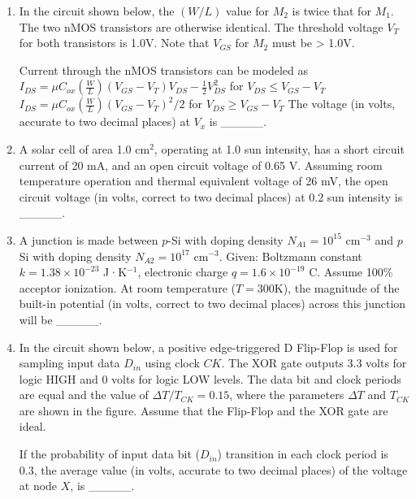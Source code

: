 \documentclass{article}
\begin{document}
\begin{enumerate}
\item In the circuit shown below, the $(W/L)$ value for $M_2$ is twice that for $M_1$. The two nMOS transistors are otherwise identical. The threshold voltage $V_T$ for both transistors is 1.0V. Note that $V_{GS}$ for $M_2$ must be > 1.0V.
\begin{figure}[H]
    \centering
    
    \caption{}
    \label{fig:q53}
\end{figure}
Current through the nMOS transistors can be modeled as
$I_{DS} = \mu C_{ox} \left( \frac{W}{L} \right) \left( V_{GS} - V_T \right) V_{DS} - \frac{1}{2} V_{DS}^2$ for $V_{DS} \leq V_{GS} - V_T$
$I_{DS} = \mu C_{ox} \left( \frac{W}{L} \right) \left( V_{GS} - V_T \right)^2 / 2$ for $V_{DS} \geq V_{GS} - V_T$
The voltage (in volts, accurate to two decimal places) at $V_x$ is \_\_\_\_\_.

\item A solar cell of area 1.0 cm$^2$, operating at 1.0 sun intensity, has a short circuit current of 20 mA, and an open circuit voltage of 0.65 V. Assuming room temperature operation and thermal equivalent voltage of 26 mV, the open circuit voltage (in volts, correct to two decimal places) at 0.2 sun intensity is \_\_\_\_\_.

\item A junction is made between $p$-Si with doping density $N_{A1} = 10^{15}$ cm$^{-3}$ and $p$ Si with doping density $N_{A2} = 10^{17}$ cm$^{-3}$. Given: Boltzmann constant $k = 1.38 \times 10^{-23}$ J·K$^{-1}$, electronic charge $q = 1.6 \times 10^{-19}$ C. Assume 100\% acceptor ionization. At room temperature ($T = 300$K), the magnitude of the built-in potential (in volts, correct to two decimal places) across this junction will be \_\_\_\_\_.

\item In the circuit shown below, a positive edge-triggered D Flip-Flop is used for sampling input data $D_{in}$ using clock $CK$. The XOR gate outputs 3.3 volts for logic HIGH and 0 volts for logic LOW levels. The data bit and clock periods are equal and the value of $\Delta T/T_{CK} = 0.15$, where the parameters $\Delta T$ and $T_{CK}$ are shown in the figure. Assume that the Flip-Flop and the XOR gate are ideal.
\begin{figure}[H]
    \centering
    
    \caption{}
    \label{fig:q56}
\end{figure}
If the probability of input data bit ($D_{in}$) transition in each clock period is 0.3, the average value (in volts, accurate to two decimal places) of the voltage at node $X$, is \_\_\_\_\_.


\end{enumerate}
\end{document}
